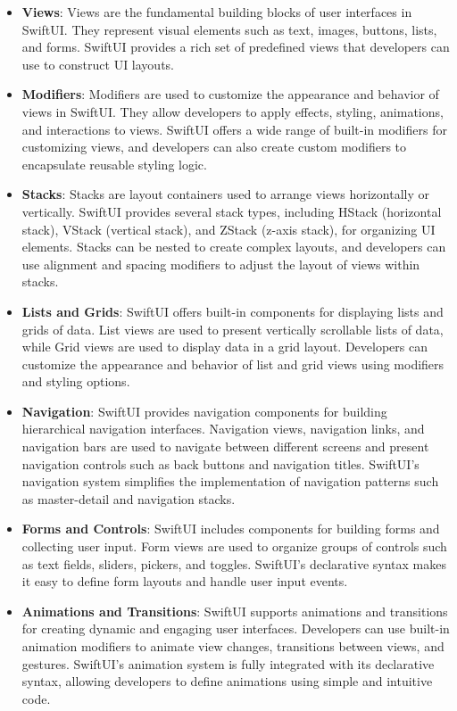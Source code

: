 \documentclass[
  biblatex,
  language=english,
  figures=false,
  sourcecodes,
  glossaries,
  index
]{kidiplom}
\begin{document}
\begin{itemize}
    \item \textbf{Views}: Views are the fundamental building blocks of user interfaces in SwiftUI. They represent visual elements such as text, images, buttons, lists, and forms. SwiftUI provides a rich set of predefined views that developers can use to construct UI layouts.
    
    \item \textbf{Modifiers}: Modifiers are used to customize the appearance and behavior of views in SwiftUI. They allow developers to apply effects, styling, animations, and interactions to views. SwiftUI offers a wide range of built-in modifiers for customizing views, and developers can also create custom modifiers to encapsulate reusable styling logic.
    
    \item \textbf{Stacks}: Stacks are layout containers used to arrange views horizontally or vertically. SwiftUI provides several stack types, including HStack (horizontal stack), VStack (vertical stack), and ZStack (z-axis stack), for organizing UI elements. Stacks can be nested to create complex layouts, and developers can use alignment and spacing modifiers to adjust the layout of views within stacks.
    
    \item \textbf{Lists and Grids}: SwiftUI offers built-in components for displaying lists and grids of data. List views are used to present vertically scrollable lists of data, while Grid views are used to display data in a grid layout. Developers can customize the appearance and behavior of list and grid views using modifiers and styling options.
    
    \item \textbf{Navigation}: SwiftUI provides navigation components for building hierarchical navigation interfaces. Navigation views, navigation links, and navigation bars are used to navigate between different screens and present navigation controls such as back buttons and navigation titles. SwiftUI's navigation system simplifies the implementation of navigation patterns such as master-detail and navigation stacks.
    
    \item \textbf{Forms and Controls}: SwiftUI includes components for building forms and collecting user input. Form views are used to organize groups of controls such as text fields, sliders, pickers, and toggles. SwiftUI's declarative syntax makes it easy to define form layouts and handle user input events.
    
    \item \textbf{Animations and Transitions}: SwiftUI supports animations and transitions for creating dynamic and engaging user interfaces. Developers can use built-in animation modifiers to animate view changes, transitions between views, and gestures. SwiftUI's animation system is fully integrated with its declarative syntax, allowing developers to define animations using simple and intuitive code.
\end{itemize}
\end{document}
